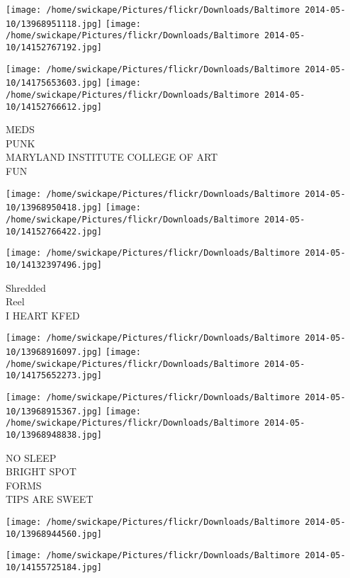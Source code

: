\documentclass[10pt,letterpaper]{article}
\begin{document}
\texttt{[image: /home/swickape/Pictures/flickr/Downloads/Baltimore 2014-05-10/13968951118.jpg]}
\texttt{[image: /home/swickape/Pictures/flickr/Downloads/Baltimore 2014-05-10/14152767192.jpg]}

\texttt{[image: /home/swickape/Pictures/flickr/Downloads/Baltimore 2014-05-10/14175653603.jpg]}
\texttt{[image: /home/swickape/Pictures/flickr/Downloads/Baltimore 2014-05-10/14152766612.jpg]}

MEDS\\
PUNK\\
MARYLAND INSTITUTE COLLEGE OF ART\\
FUN\\
\pagebreak

\texttt{[image: /home/swickape/Pictures/flickr/Downloads/Baltimore 2014-05-10/13968950418.jpg]}
\texttt{[image: /home/swickape/Pictures/flickr/Downloads/Baltimore 2014-05-10/14152766422.jpg]}

\vspace{0.25in}
\texttt{[image: /home/swickape/Pictures/flickr/Downloads/Baltimore 2014-05-10/14132397496.jpg]}

Shredded\\
Reel\\
I HEART KFED\\
\pagebreak

\texttt{[image: /home/swickape/Pictures/flickr/Downloads/Baltimore 2014-05-10/13968916097.jpg]}
\texttt{[image: /home/swickape/Pictures/flickr/Downloads/Baltimore 2014-05-10/14175652273.jpg]}

\texttt{[image: /home/swickape/Pictures/flickr/Downloads/Baltimore 2014-05-10/13968915367.jpg]}
\texttt{[image: /home/swickape/Pictures/flickr/Downloads/Baltimore 2014-05-10/13968948838.jpg]}

NO SLEEP\\
BRIGHT SPOT\\
FORMS\\
TIPS ARE SWEET\\
\pagebreak

\texttt{[image: /home/swickape/Pictures/flickr/Downloads/Baltimore 2014-05-10/13968944560.jpg]}

\vspace{0.25in}
\texttt{[image: /home/swickape/Pictures/flickr/Downloads/Baltimore 2014-05-10/14155725184.jpg]}
\end{document}
